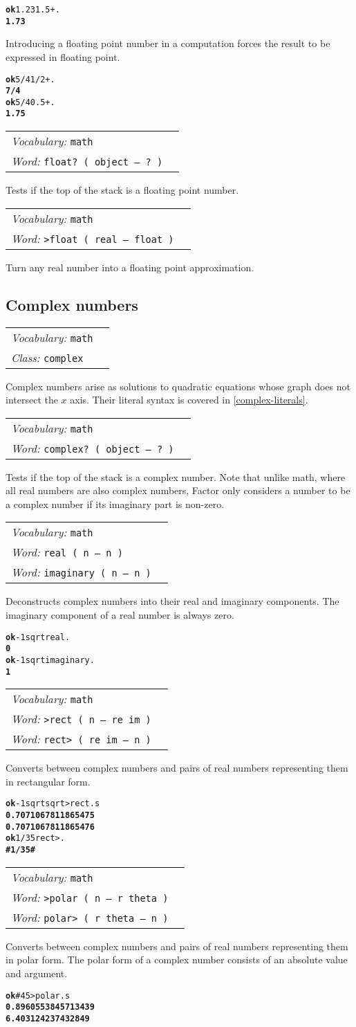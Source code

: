 \documentclass{book}
\newcommand{\tto}{\symbol{123}}
\newcommand{\ttc}{\symbol{125}}
\newcommand{\vocabulary}[1]{\emph{Vocabulary:} \texttt{#1}&\\}
\newcommand{\ordinaryword}[2]{\index{\texttt{#1}}\emph{Word:} \texttt{#2}&\\}
\newcommand{\classword}[1]{\index{\texttt{#1}}\emph{Class:} \texttt{#1}&\\}
\newcommand{\predword}[1]{\ordinaryword{#1}{#1~( object -- ?~)}}
\newcommand{\wordtable}[1]{

\begin{tabularx}{12cm}[t]{lX}
\hline
#1
\hline
\end{tabularx}

}
\begin{document}
\begin{alltt}
\textbf{ok} 1.23 1.5 + .
\textbf{1.73}
\end{alltt}

Introducing a floating point number in a computation forces the result to be expressed in floating point.

\begin{alltt}
\textbf{ok} 5/4 1/2 + .
\textbf{7/4}
\textbf{ok} 5/4 0.5 + .
\textbf{1.75}
\end{alltt}

\wordtable{
\vocabulary{math}
\predword{float?}
}
Tests if the top of the stack is a floating point number.
\wordtable{
\vocabulary{math}
\ordinaryword{>float}{>float ( real -- float )}
}
Turn any real number into a floating point approximation.

\subsection{\label{complex-numbers}Complex numbers}

\wordtable{
\vocabulary{math}
\classword{complex}
}
Complex numbers arise as solutions to quadratic equations whose graph does not intersect the $x$ axis. Their literal syntax is covered in \ref{complex-literals}.

\wordtable{
\vocabulary{math}
\predword{complex?}
}
Tests if the top of the stack is a complex number. Note that unlike math, where all real numbers are also complex numbers, Factor only considers a number to be a complex number if its imaginary part is non-zero.

\wordtable{
\vocabulary{math}
\ordinaryword{real}{real ( n -- n )}
\ordinaryword{imaginary}{imaginary ( n -- n )}
}
Deconstructs complex numbers into their real and imaginary components. The imaginary component of a real number is always zero.
\begin{alltt}
\textbf{ok} -1 sqrt real .
\textbf{0}
\textbf{ok} -1 sqrt imaginary .
\textbf{1}
\end{alltt}
\wordtable{
\vocabulary{math}
\ordinaryword{>rect}{>rect ( n -- re im )}
\ordinaryword{rect>}{rect> ( re im -- n )}
}
Converts between complex numbers and pairs of real numbers representing them in rectangular form.
\begin{alltt}
\textbf{ok} -1 sqrt sqrt >rect .s
\textbf{0.7071067811865475
0.7071067811865476}
\textbf{ok} 1/3 5 rect> .
\textbf{\#\tto 1/3 5 \ttc\#}
\end{alltt}

\wordtable{
\vocabulary{math}
\ordinaryword{>polar}{>polar ( n -- r theta )}
\ordinaryword{polar>}{polar> ( r theta -- n )}
}
Converts between complex numbers and pairs of real numbers representing them in polar form. The polar form of a complex number consists of an absolute value and argument.
\begin{alltt}
\textbf{ok} \#\tto 4 5 \ttc >polar .s
\textbf{0.8960553845713439
6.403124237432849}
\end{alltt}
\end{document}
